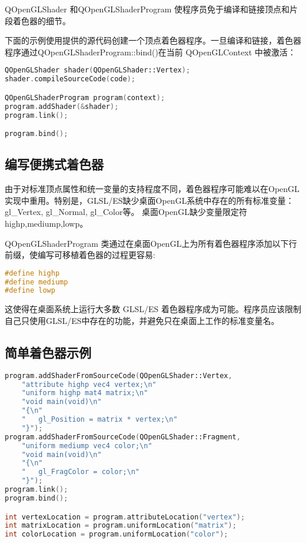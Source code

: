 QOpenGLShader 和QOpenGLShaderProgram 使程序员免于编译和链接顶点和片段着色器的细节。

下面的示例使用提供的源代码创建一个顶点着色器程序。一旦编译和链接，着色器程序通过QOpenGLShaderProgram::bind()在当前 QOpenGLContext 中被激活：


\begin{lstlisting}[language=C++]
QOpenGLShader shader(QOpenGLShader::Vertex);
shader.compileSourceCode(code);

QOpenGLShaderProgram program(context);
program.addShader(&shader);
program.link();

program.bind();
\end{lstlisting}


\subsection{编写便携式着色器}

由于对标准顶点属性和统一变量的支持程度不同，着色器程序可能难以在OpenGL实现中重用。特别是，GLSL/ES缺少桌面OpenGL系统中存在的所有标准变量：gl\_Vertex, gl\_Normal, gl\_Color等。
桌面OpenGL缺少变量限定符highp,mediump,lowp。

QOpenGLShaderProgram 类通过在桌面OpenGL上为所有着色器程序添加以下行前缀，使编写可移植着色器的过程更容易:

\begin{lstlisting}[language=C++]
#define highp
#define mediump
#define lowp
\end{lstlisting}

这使得在桌面系统上运行大多数 GLSL/ES 着色器程序成为可能。程序员应该限制自己只使用GLSL/ES中存在的功能，并避免只在桌面上工作的标准变量名。

\subsection{简单着色器示例}

\begin{lstlisting}[language=C++]
    program.addShaderFromSourceCode(QOpenGLShader::Vertex,
    "attribute highp vec4 vertex;\n"
    "uniform highp mat4 matrix;\n"
    "void main(void)\n"
    "{\n"
    "   gl_Position = matrix * vertex;\n"
    "}");
program.addShaderFromSourceCode(QOpenGLShader::Fragment,
    "uniform mediump vec4 color;\n"
    "void main(void)\n"
    "{\n"
    "   gl_FragColor = color;\n"
    "}");
program.link();
program.bind();

int vertexLocation = program.attributeLocation("vertex");
int matrixLocation = program.uniformLocation("matrix");
int colorLocation = program.uniformLocation("color");
\end{lstlisting}

